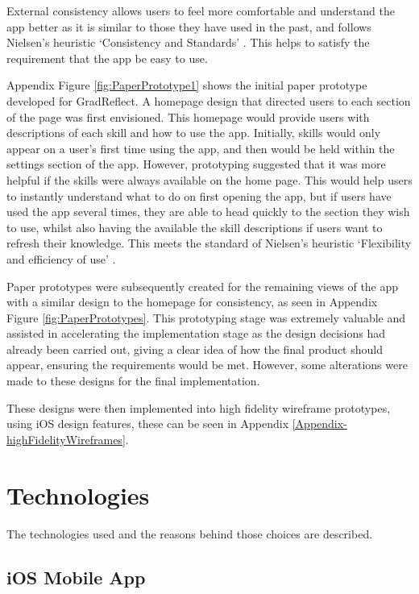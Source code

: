 \documentclass{l4proj}
\begin{document}
External consistency allows users to feel more comfortable and understand the app better as it is similar to those they have used in the past, and follows Nielsen’s heuristic ‘Consistency and Standards’ \citep{schlatter_visual_2013, Nielsen10}. This helps to satisfy the requirement that the app be easy to use. 

Appendix Figure \ref{fig:PaperPrototype1} shows the initial paper prototype developed for GradReflect. A homepage design that directed users to each section of the page was first envisioned. This homepage would provide users with descriptions of each skill and how to use the app. Initially, skills would only appear on a user’s first time using the app, and then would be held within the settings section of the app. However, prototyping suggested that it was more helpful if the skills were always available on the home page. This would help users to instantly understand what to do on first opening the app, but if users have used the app several times, they are able to head quickly to the section they wish to use, whilst also having the available the skill descriptions if users want to refresh their knowledge. This meets the standard of Nielsen’s heuristic ‘Flexibility and efficiency of use’ \citep{Nielsen10}.

Paper prototypes were subsequently created for the remaining views of the app with a similar design to the homepage for consistency, as seen in Appendix Figure \ref{fig:PaperPrototypes}. This prototyping stage was extremely valuable and assisted in accelerating the implementation stage as the design decisions had already been carried out, giving a clear idea of how the final product should appear, ensuring the requirements would be met. However, some alterations were made to these designs for the final implementation. 

These designs were then implemented into high fidelity wireframe prototypes, using iOS design features, these can be seen in Appendix \ref{Appendix-highFidelityWireframes}.


\section{Technologies}

The technologies used and the reasons behind those choices are described.

\subsection{iOS Mobile App}
\end{document}
